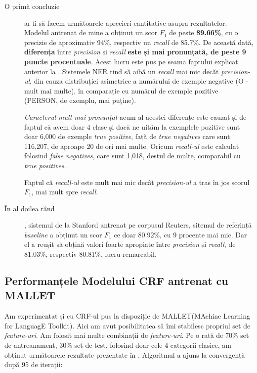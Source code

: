 \begin{description}

\item[O primă concluzie] ar fi să facem următoarele aprecieri cantitative asupra rezultatelor. Modelul antrenat de mine a obținut un scor \textbf{$F_1$} de peste \textbf{89.66\%}, cu o precizie de aproximativ 94\%, respectiv un \textit{recall} de 85.7\%.  De această dată, \textbf{diferența} între \textit{precision} și \textit{recall}\textbf{ este și mai pronunțată, de peste 9 puncte procentuale}. Acest lucru este pus pe seama faptului explicat anterior la . Sistemele NER tind să aibă un \textit{recall} mai mic decăt \textit{precision-ul}, din cauza distribuției asimetrice a numărului de exemple negative (O - mult mai multe), în comparație cu numărul de exemple pozitive (PERSON, de exemplu, mai puține). 

\textit{Caracterul mult mai pronunțat} acum al acestei diferențe este cauzat și de faptul că avem doar 4 clase și dacă ne uităm la exemplele pozitive sunt doar 6,000 de exemple \textit{true positive}, față de \textit{true negatives} care sunt 116,207, de aproape 20 de ori mai multe. Oricum \textit{recall-ul} este calculat folosind \textit{false negatives}, care sunt 1,018, destul de multe, comparabil cu \textit{true positives}.

Faptul că \textit{recall-ul} este mult mai mic decât \textit{precision-ul} a tras în jos scorul $F_1$, mai mult spre \textit{recall}.

\item[În al doilea rând], sistemul de la Stanford antrenat pe corpusul Reuters, sitemul de referință \textit{baseline} a obținut un scor $F_1$ ce doar 80.92\%, cu 9 procente mai mic. Dar el a reușit să obțină  valori foarte apropiate între \textit{precision} și \textit{recall}, de 81.03\%, respectiv 80.81\%, lucru remarcabil.

\end{description}

\subsection{Performanțele Modelului CRF antrenat cu MALLET}

Am experimentat și cu CRF-ul pus la dispoziție de MALLET(MAchine Learning for LanguagE Toolkit). Aici am avut posibilitatea să îmi stabilesc propriul set de \textit{feature-uri}. Am folosit mai multe combinații de \textit{feature-uri}. Pe o rată de 70\% set de antreanament, 30\% set de test, folosind doar cele 4 categorii clasice, am obținut următoarele rezultate prezentate în . Algoritmul a ajuns la convergență după 95 de iterații:

